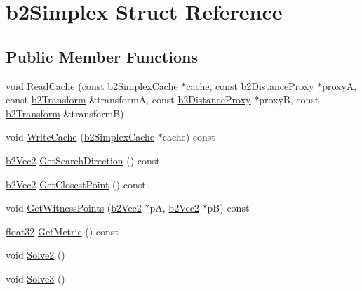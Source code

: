 \hypertarget{structb2_simplex}{}\section{b2\+Simplex Struct Reference}
\label{structb2_simplex}
\subsection*{Public Member Functions}
\begin{DoxyCompactItemize}
\item 
void \mbox{\hyperlink{structb2_simplex_ada29ffb34774589d2e4686316104ddbc}{Read\+Cache}} (const \mbox{\hyperlink{structb2_simplex_cache}{b2\+Simplex\+Cache}} $\ast$cache, const \mbox{\hyperlink{structb2_distance_proxy}{b2\+Distance\+Proxy}} $\ast$proxyA, const \mbox{\hyperlink{structb2_transform}{b2\+Transform}} \&transformA, const \mbox{\hyperlink{structb2_distance_proxy}{b2\+Distance\+Proxy}} $\ast$proxyB, const \mbox{\hyperlink{structb2_transform}{b2\+Transform}} \&transformB)
\item 
void \mbox{\hyperlink{structb2_simplex_a8161f17ee71e0620b63842a05776dd4b}{Write\+Cache}} (\mbox{\hyperlink{structb2_simplex_cache}{b2\+Simplex\+Cache}} $\ast$cache) const
\item 
\mbox{\hyperlink{structb2_vec2}{b2\+Vec2}} \mbox{\hyperlink{structb2_simplex_af29facd0f4138b32929b575e74ecabd9}{Get\+Search\+Direction}} () const
\item 
\mbox{\hyperlink{structb2_vec2}{b2\+Vec2}} \mbox{\hyperlink{structb2_simplex_a2044bf067dd5f65d63f96ca6e1dded45}{Get\+Closest\+Point}} () const
\item 
void \mbox{\hyperlink{structb2_simplex_ac0ce6596bc03509851efb79e8824c1cd}{Get\+Witness\+Points}} (\mbox{\hyperlink{structb2_vec2}{b2\+Vec2}} $\ast$pA, \mbox{\hyperlink{structb2_vec2}{b2\+Vec2}} $\ast$pB) const
\item 
\mbox{\hyperlink{b2_settings_8h_aacdc525d6f7bddb3ae95d5c311bd06a1}{float32}} \mbox{\hyperlink{structb2_simplex_a9ca3fb6a480b36f80c3eadfb2b387d02}{Get\+Metric}} () const
\item 
void \mbox{\hyperlink{structb2_simplex_a449fa9b3f63d7f49535dfe9767f1b9bd}{Solve2}} ()
\item 
void \mbox{\hyperlink{structb2_simplex_a7835361343a7388b8f15c94c8deb48c6}{Solve3}} ()
\end{DoxyCompactItemize}
